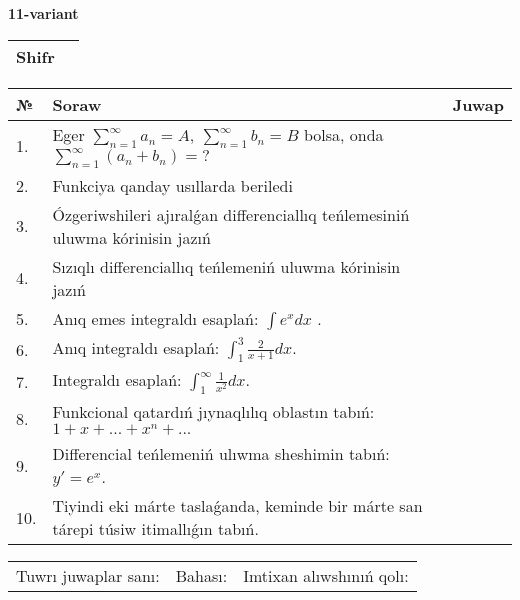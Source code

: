 \documentclass{article}
\begin{document}
  \egroup
  
  \newpage
  
  
  \textbf{11-variant}\\
  
  \bgroup
  \def\arraystretch{1.6} %
  
  \begin{tabular}{|m{5.7cm}|m{9.5cm}|}
  \hline
  Shifr & \\
  \hline
  \end{tabular}
  
  \vspace{1cm}
  
  \begin{tabular}{|m{0.7cm}|m{10cm}|m{4cm}|}
  \hline
  № & Soraw & Juwap \\
  \hline
  1. & Eger \(\sum_{n = 1}^{\infty}a_{n} = A,\ \sum_{n = 1}^{\infty}b_{n} = B\) bolsa, onda \(\sum_{n = 1}^{\infty}\left( a_{n} + b_{n} \right) = ?\) &  \\
  \hline
  2. & Funkciya qanday usıllarda beriledi &  \\
  \hline
  3. & Ózgeriwshileri ajıralǵan differenciallıq teńlemesiniń uluwma kórinisin jazıń &  \\
  \hline
  4. & Sızıqlı differenciallıq teńlemeniń uluwma kórinisin jazıń &  \\
  \hline
  5. & Anıq emes integraldı esaplań: \(\int{e^{x}dx}\) . &  \\
  \hline
  6. & Anıq integraldı esaplań: \(\int_{1}^{3}\frac{2}{x + 1}dx\). &  \\
  \hline
  7. & Integraldı esaplań: \(\int_{1}^{\infty}{\frac{1}{x^2 }dx}\). &  \\
  \hline
  8. & Funkcional qatardıń jıynaqlılıq oblastın tabıń:\(1 + x + ... + x^{n} + ...\) &  \\
  \hline
  9. & Differencial teńlemeniń ulıwma sheshimin tabıń: \(y' = e^{x}\). &  \\
  \hline
  10. & Tiyindi eki márte taslaǵanda, keminde bir márte san tárepi túsiw itimallıǵın tabıń. &  \\
  \hline
  \end{tabular}
  
  \vspace{1cm}
  
  \begin{tabular}{lll}
  Tuwrı juwaplar sanı: \underline{\hspace{1.5cm}} & 
  Bahası: \underline{\hspace{1.5cm}} & 
  Imtixan alıwshınıń qolı: \underline{\hspace{2cm}} \\
  \end{tabular}
  
\end{document}
